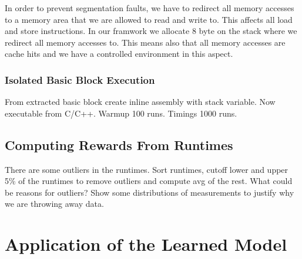 In order to prevent segmentation faults, we have to redirect all memory accesses to a memory area that we are allowed to read and write to.
This affects all load and store instructions.
In our framwork we allocate 8 byte on the stack where we redirect all memory accesses to.
This means also that all memory accesses are cache hits and we have a controlled environment in this aspect.


\subsubsection{Isolated Basic Block Execution}
From extracted basic block create inline assembly with stack variable. Now executable from C/C++.
Warmup 100 runs. Timings 1000 runs. 
\subsection{Computing Rewards From Runtimes}
There are some outliers in the runtimes. Sort runtimes, cutoff lower and upper 5\% of the runtimes to remove outliers and compute avg of the rest.
What could be reasons for outliers?
Show some distributions of measurements to justify why we are throwing away data.

\section{Application of the Learned Model}
\label{sec:approach:ml-scheduler}





